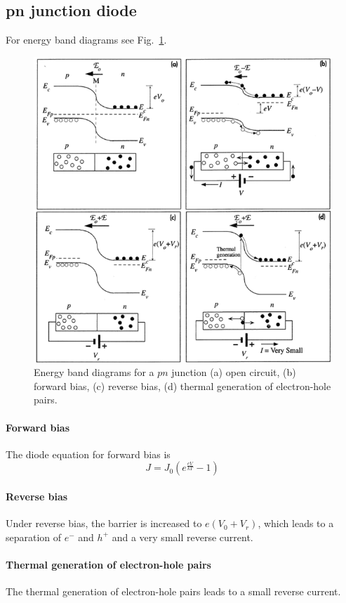 \subsection{pn junction diode}

For energy band diagrams see Fig.~\ref{fig:pndiode}.

\begin{figure}[ht!]
    \centering
    \includegraphics[width=0.6\linewidth]{images/pndiode.png}
    \caption{Energy band diagrams for a $pn$ junction (a) open circuit, (b) forward bias, (c) reverse bias, (d) thermal generation of electron-hole pairs.}
    \label{fig:pndiode}
\end{figure}

\paragraph{Forward bias}
The diode equation for forward bias is
\begin{equation}
    J = J_0 \left(e^{\frac{eV}{kT}} -1\right)
\end{equation}

\paragraph{Reverse bias}
Under reverse bias, the barrier is increased to $e (V_0 + V_r)$, which leads
to a separation of $e^-$ and $h^+$ and a very small reverse current.

\paragraph{Thermal generation of electron-hole pairs}
The thermal generation of electron-hole pairs leads to a small reverse current.

